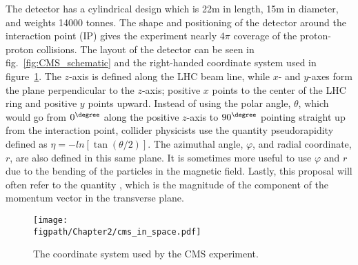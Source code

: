 The detector has a cylindrical design which is 22\unit{m} in length, 15\unit{m} in diameter, and weights 14000 tonnes.
The shape and positioning of the detector around the interaction point (IP) gives the experiment nearly $4\pi$ coverage of the proton-proton collisions.
The layout of the detector can be seen in fig.~\ref{fig:CMS_schematic} and the right-handed coordinate system used in figure~\ref{fig:CMS_coordinate_system}.
The $z$-axis is defined along the LHC beam line, while $x$- and $y$-axes form the plane perpendicular to the $z$-axis; positive $x$ points to the center of the LHC ring and positive $y$ points upward.
Instead of using the polar angle, $\theta$, which would go from $0^{\degree}$ along the positive $z$-axis to $90^{\degree}$ pointing straight up from the interaction point, collider physicists use the quantity pseudorapidity defined as $\eta=-ln\left[\tan\left(\theta/2\right)\right]$.
The azimuthal angle, $\varphi$, and radial coordinate, $r$, are also defined in this same plane.
It is sometimes more useful to use $\varphi$ and $r$ due to the bending of the particles in the magnetic field.
Lastly, this proposal will often refer to the quantity \pt, which is the magnitude of the component of the momentum vector in the transverse plane.

\begin{figure}[!hbt]
	\centering
	\texttt{[image: \\figpath/Chapter2/cms\_in\_space.pdf]}
	\caption{The coordinate system used by the CMS experiment.}
	\label{fig:CMS_coordinate_system}
\end{figure}
